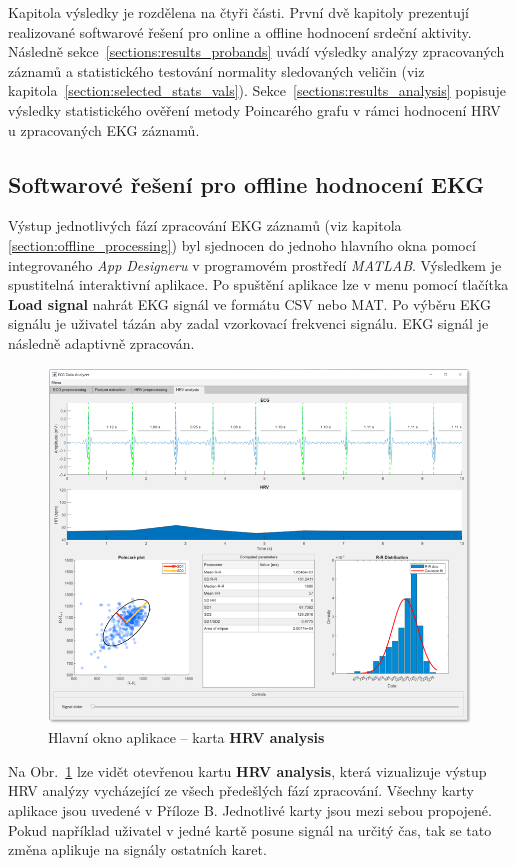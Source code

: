Kapitola výsledky je rozdělena na čtyři části. První dvě kapitoly prezentují
realizované softwarové řešení pro online a offline hodnocení srdeční aktivity.
Následně sekce~\ref{sections:results_probands} uvádí výsledky analýzy
zpracovaných záznamů a statistického testování normality sledovaných veličin
(viz kapitola~\ref{section:selected_stats_vals}).
Sekce~\ref{sections:results_analysis} popisuje výsledky statistického ověření
metody Poincarého grafu v rámci hodnocení HRV u zpracovaných EKG záznamů.

\subsection{Softwarové řešení pro offline hodnocení EKG}
\label{sections:results_online}
Výstup jednotlivých fází zpracování EKG záznamů (viz kapitola
\ref{section:offline_processing}) byl sjednocen do jednoho hlavního okna pomocí
integrovaného \textit{App Designeru} \cite{matlabAPPDESIGNER} v programovém
prostředí \textit{MATLAB}. Výsledkem je spustitelná interaktivní aplikace. Po
spuštění aplikace lze v menu pomocí tlačítka \textbf{Load signal} nahrát EKG
signál ve formátu CSV nebo MAT. Po výběru EKG signálu je uživatel tázán aby
zadal vzorkovací frekvenci signálu. EKG signál je následně adaptivně zpracován.
\begin{figure}[h]
	\begin{center}
		\includegraphics[width=1\textwidth]{../assets/matlab_EDA/tab4}
		\caption{Hlavní okno aplikace -- karta \textbf{HRV analysis}}
		\label{fig:results_matlab_tab4}
	\end{center}
\end{figure}
Na Obr.~\ref{fig:results_matlab_tab4} lze vidět otevřenou kartu \textbf{HRV
	analysis}, která vizualizuje výstup HRV analýzy vycházející ze všech předešlých
fází zpracování. Všechny karty aplikace jsou uvedené v Příloze B. Jednotlivé
karty jsou mezi sebou propojené. Pokud například uživatel v jedné kartě posune
signál na určitý čas, tak se tato změna aplikuje na signály ostatních karet.

